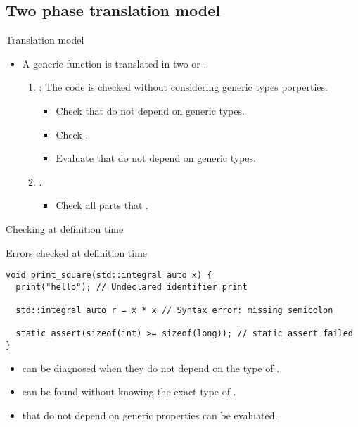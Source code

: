 \subsection{Two phase translation model}

\begin{frame}[t,fragile]{Translation model}
\begin{itemize}
  \item A generic function is translated in two  or .

  \begin{enumerate}

    \item {}:
          The code is checked without considering generic types porperties.
      \begin{itemize}
        \item Check  that do not depend on generic types.
        \item Check .
        \item Evaluate  that do not depend on generic types.
      \end{itemize}
    

    \item {}.
      \begin{itemize}
        \item Check all parts that .
      \end{itemize}

  \end{enumerate}
\end{itemize}
\end{frame}

\begin{frame}[t,fragile]{Checking at definition time}
\begin{block}{Errors checked at definition time}
\begin{lstlisting}
void print_square(std::integral auto x) {
  print("hello"); // Undeclared identifier print

  std::integral auto r = x * x // Syntax error: missing semicolon

  static_assert(sizeof(int) >= sizeof(long)); // static_assert failed
}
\end{lstlisting}
\end{block}

  \begin{itemize}
    \item {} can be diagnosed 
          when they do not depend on the type of .

    \item {} can be found 
          without knowing the exact type of .

    \item {} that do not depend 
          on generic properties can be evaluated.
  \end{itemize}
\end{frame}

